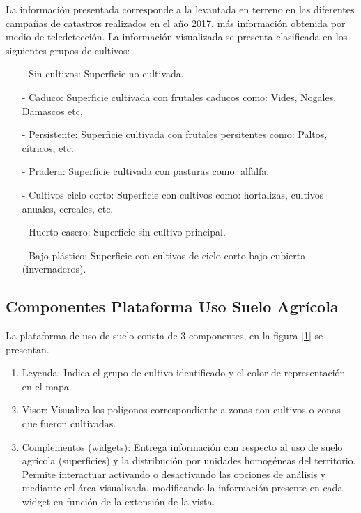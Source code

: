 \documentclass[10pt]{article}
\begin{document}
La información presentada corresponde a la levantada en terreno en las diferentes campañas de catastros realizados en el año 2017, más información obtenida por medio de teledetección. 
La información visualizada se presenta clasificada en los siguientes grupos de cultivos:

\begin{itemize}

\item[-]Sin cultivos: Superficie no cultivada.
\item[-]Caduco: Superficie cultivada con frutales caducos como: Vides, Nogales, Damascos etc,
\item[-]Persistente: Superficie cultivada con frutales persitentes como: Paltos, cítricos, etc.
\item[-]Pradera: Superficie cultivada con pasturas como: alfalfa.
\item[-]Cultivos ciclo corto: Superficie con cultivos como: hortalizas, cultivos anuales, cereales, etc.
\item[-]Huerto casero: Superficie sin cultivo principal.
\item[-]Bajo plástico: Superficie con cultivos de ciclo corto bajo cubierta (invernaderos). \bigskip\setlength{\parindent}{0pt}
\end{itemize}

\subsection{Componentes Plataforma Uso Suelo Agrícola}
\label{2.1}

La plataforma de uso de suelo consta de 3 componentes, en la figura \ref{1} se presentan.

\begin{enumerate}
\item Leyenda: Indica el grupo de cultivo identificado y el color de representación en el mapa.
\item Visor: Visualiza los polígonos correspondiente a zonas con cultivos o zonas que fueron cultivadas.
\item	Complementos (widgets): Entrega información con respecto al uso de suelo agrícola (superficies) y la distribución por unidades homogéneas del territorio. Permite interactuar activando o desactivando las opciones de análisis y mediante erl área visualizada, modificando la información presente en cada widget en función de la extensión de la vista.

\end{enumerate}
\end{document}
